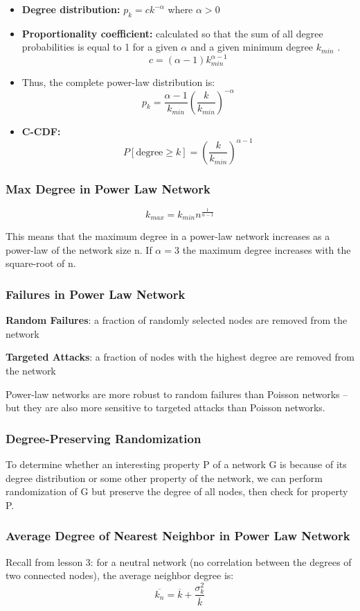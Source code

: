 \documentclass[11pt]{scrartcl} %
\begin{document}
\begin{itemize}
	\item \textbf{Degree distribution:} $p_k = ck^{-\alpha}$ where $\alpha > 0$
	\item \textbf{Proportionality coefficient:} calculated so that the sum of all degree probabilities is equal to 1 for a given $\alpha$ and a given minimum degree $k_{min}$ .\\ 
\[ c = (\alpha-1) k_{min}^{\alpha-1} \]
	\item Thus, the complete power-law distribution is: 
\[ p_k = \frac{\alpha-1}{k_{min}} (\frac{k}{k_{min}})^{-\alpha} \]
	\item \textbf{C-CDF:} 
\[ P \left[ \text{degree} \geq k \right] = (\frac{k}{k_{min}})^{\alpha-1} \]
\end{itemize}

\subsubsection{Max Degree in Power Law Network}
\[k_{max} = k_{min} n^{\frac{1}{\alpha-1}}\]

This means that the maximum degree in a power-law network increases as a power-law of the network size n. If $\alpha=3$ the maximum degree increases with the square-root of n.

\subsubsection{Failures in Power Law Network}
\textbf{Random Failures}: a fraction of randomly selected nodes are removed from the network

\textbf{Targeted Attacks}: a fraction of nodes with the highest degree are removed from the network

Power-law networks are more robust to random failures than Poisson networks – but they are also more sensitive to targeted attacks than Poisson networks.

\subsubsection{Degree-Preserving Randomization}
To determine whether an interesting property P of a network G is because of its degree distribution or some other property of the network, we can perform randomization of G but preserve the degree of all nodes, then check for property P.

\subsubsection{Average Degree of Nearest Neighbor in Power Law Network}
Recall from lesson 3: for a neutral network (no correlation between the degrees of two connected nodes), the average neighbor degree is: 
\[ \overline{k_n} = \overline{k} + \frac{\sigma_k^2}{\overline{k}}\]
\end{document}
